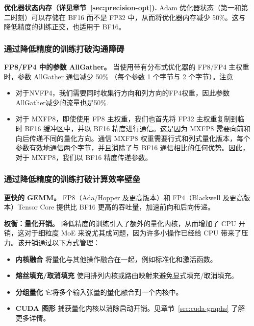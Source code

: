 \textbf{优化器状态内存（详见章节~\ref{sec:precision-opt}).} Adam 优化器状态（第一和第二时刻）可以存储在 BF16 而不是 FP32 中，从而将优化器内存减少 50\%。这与降低精度的训练正交，也适用于 BF16。

\subsubsection{通过降低精度的训练打破沟通障碍}
\label{sec:comm_wall_quantized_training}


\textbf{FP8/FP4 中的参数 AllGather。} 当使用带有分布式优化器的 FP8/FP4 主权重时，参数 AllGather 通信减少 50\% （每个参数 1 个字节与 2 个字节）。注意
\begin{itemize}
    \item 对于NVFP4，我们需要同时收集行方向和列方向的FP4权重，因此参数AllGather减少的流量也是50\%.
    \item 对于 MXFP8，即使使用 FP8 主权重，我们也首先将 FP32 主权重复制到临时 BF16 缓冲区中，并以 BF16 精度进行通信。这是因为 MXFP8 需要向前和向后传递不同的量化方向。通信 MXFP8 权重需要行式和列式量化版本，每个参数有效地通信两个字节，并且消除了与 BF16 通信相比的任何优势。因此，对于 MXFP8，我们以 BF16 精度传递参数。 
\end{itemize}

\subsubsection{通过降低精度的训练打破计算效率壁垒}

\textbf{更快的 GEMM。} FP8（Ada/Hopper 及更高版本）和 FP4（Blackwell 及更高版本）Tensor Core 提供比 BF16 更高的吞吐量，加速前向和后向传递。

\textbf{权衡：量化开销。} 降低精度的训练引入了额外的量化内核，从而增加了 CPU 开销，这对于细粒度 MoE 来说尤其成问题，因为许多小操作已经给 CPU 带来了压力。该开销通过以下方式管理：
\begin{itemize}
    \item \textbf{内核融合} 将量化与其他操作融合在一起，例如标准化和激活函数。
    \item \textbf{熔丝填充/取消填充} 使用排列内核或路由映射来避免显式填充/取消填充。
    \item \textbf{分组量化} 它将多个输入张量的量化融合到一个内核中。
    \item \textbf{CUDA 图形} 捕获量化内核以消除启动开销。见章节~\ref{sec:cuda-graphs} 了解更多详情。
\end{itemize}


